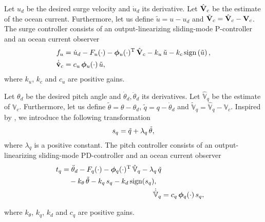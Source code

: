 Let $u_d$ be the desired surge velocity and $\dot{u}_d$ its derivative.
Let $\hat{\mathbf{V}}_c$ be the estimate of the ocean current.
Furthermore, let us define $\tilde{u} = u - u_d$ and $\tilde{\mathbf{V}}_c = \hat{\mathbf{V}}_c - \mathbf{V}_c$.
The surge controller consists of an output-linearizing sliding-mode P-controller and an ocean current observer \vspace{-1mm}
\begin{align}
    f_u &= \dot{u}_d - F_u(\cdot) - \bs{\phi}_u(\cdot)\T\,\oceanhat - k_u\,\tilde{u} - k_c\,{\rm sign}\left(\tilde{u}\right), \label{eq:nsb_5dof_t_u} \\
    \dot{\hat{\ivel}}_c &= c_u\,\bs{\phi}_u(\cdot)\,\tilde{u}, \label{eq:nsb_5dof_V_hat_u} \vspace{-2mm}
\end{align}
where $k_u$, $k_c$ and $c_u$ are positive gains.

Let $\theta_d$ be the desired pitch angle and $\dot{\theta}_d, \ddot{\theta}_d$ its derivatives.
Let $\hat{\mathbb{V}}_q$ be the estimate of $\mathbb{V}_c$.
Furthermore, let us define $\tilde{\theta} = \theta - \theta_d$, $\tilde{q} = q - \dot{\theta}_d$ and $\tilde{\mathbb{V}}_q = \hat{\mathbb{V}}_q - \mathbb{V}_c$.
Inspired by \cite{moe_set-based_2017}, we introduce the following transformation \vspace{-1.5mm}
\begin{equation}
    s_q = \tilde{q} + \lambda_q\,\tilde{\theta}, \vspace{-2mm}
\end{equation}
where $\lambda_q$ is a positive constant.
The pitch controller consists of an output-linearizing sliding-mode PD-controller and an ocean current observer \vspace{-1mm}
\begin{align}
    \begin{split}
        t_q &= \ddot{\theta}_d - F_q(\cdot) - \bm{\phi}_q(\cdot)^{\mathrm{T}}\,\hat{\mathbb{V}}_q - \lambda_q\,\tilde{q} \\
        & \quad - k_{\theta}\,\tilde{\theta} - k_q\,s_q - k_d\,{\rm sign}(s_q), 
    \end{split} \label{eq:nsb_5dof_t_q} \\
    \dot{\hat{\mathbb{V}}}_q &= c_q\,\bm{\phi}_q(\cdot)\,s_q, \label{eq:nsb_5dof_V_hat_q}
\end{align}
\vspace{-5.5mm}

\noindent where $k_{\theta}$, $k_q$, $k_d$ and $c_q$ are positive gains.

